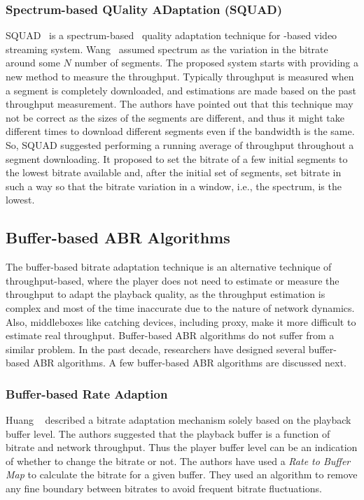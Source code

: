 \subsubsection{Spectrum-based QUality ADaptation (SQUAD)}
SQUAD~\cite{10.1145/2910017.2910593} is a spectrum-based~\cite{1386243} quality adaptation technique for -based video streaming system. Wang \etal\ assumed spectrum as the variation in the bitrate around some $N$ number of segments. The proposed system starts with providing a new method to measure the throughput. Typically throughput is measured when a segment is completely downloaded, and estimations are made based on the past throughput measurement. The authors have pointed out that this technique may not be correct as the sizes of the segments are different, and thus it might take different times to download different segments even if the bandwidth is the same. So, SQUAD suggested performing a running average of throughput throughout a segment downloading. It proposed to set the bitrate of a few initial segments to the lowest bitrate available and, after the initial set of segments, set bitrate in such a way so that the bitrate variation in a window, i.e., the spectrum, is the lowest.


\subsection{Buffer-based ABR Algorithms}
The buffer-based bitrate adaptation technique is an alternative technique of throughput-based, where the player does not need to estimate or measure the throughput to adapt the playback quality, as the throughput estimation is complex and most of the time inaccurate due to the nature of network dynamics. Also, middleboxes like catching devices, including proxy, make it more difficult to estimate real throughput. Buffer-based \ac{ABR} algorithms do not suffer from a similar problem. In the past decade, researchers have designed several buffer-based ABR algorithms. A few buffer-based \ac{ABR} algorithms are discussed next.

\subsubsection{Buffer-based Rate Adaption}
Huang \etal~\cite{Huang2014,10.1145/2398776.2398800,10.1145/2491172.2491179} described a bitrate adaptation mechanism solely based on the playback buffer level. The authors suggested that the playback buffer is a function of bitrate and network throughput. Thus the player buffer level can be an indication of whether to change the bitrate or not. The authors have used a \textit{Rate to Buffer Map} to calculate the bitrate for a given buffer. They used an algorithm to remove any fine boundary between bitrates to avoid frequent bitrate fluctuations.

